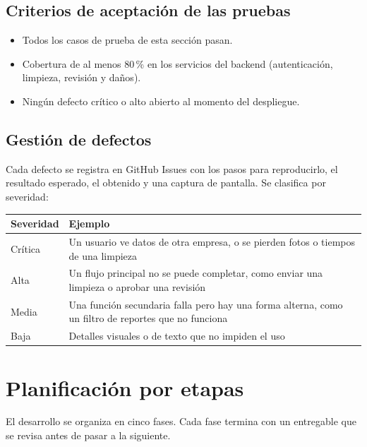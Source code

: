 \documentclass[11pt,a4paper]{article}
\begin{document}
\subsection{Criterios de aceptación de las pruebas}

\begin{itemize}[leftmargin=1.2em]
  \item Todos los casos de prueba de esta sección pasan.
  \item Cobertura de al menos 80\,\% en los servicios del backend (autenticación, limpieza, revisión y daños).
  \item Ningún defecto crítico o alto abierto al momento del despliegue.
\end{itemize}

\subsection{Gestión de defectos}

Cada defecto se registra en GitHub Issues con los pasos para reproducirlo, el resultado esperado, el obtenido y una captura de pantalla. Se clasifica por severidad:

\begin{center}
\small
\begin{tabularx}{\linewidth}{L{2cm} Y}
\toprule
\textbf{Severidad} & \textbf{Ejemplo}\\
\midrule
Crítica & Un usuario ve datos de otra empresa, o se pierden fotos o tiempos de una limpieza\\
Alta & Un flujo principal no se puede completar, como enviar una limpieza o aprobar una revisión\\
Media & Una función secundaria falla pero hay una forma alterna, como un filtro de reportes que no funciona\\
Baja & Detalles visuales o de texto que no impiden el uso\\
\bottomrule
\end{tabularx}
\end{center}

\section{Planificación por etapas}

El desarrollo se organiza en cinco fases. Cada fase termina con un entregable que se revisa antes de pasar a la siguiente.
\end{document}
